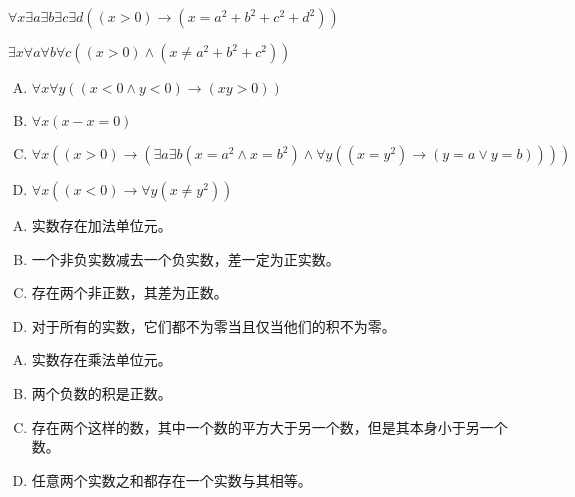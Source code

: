 {{        %
        \begin{practices}
             $\forall x \exists a \exists b \exists c \exists d ((x > 0) \rightarrow (x = a^2 + b^2 + c^2 + d^2))$
        \end{practices}

        \begin{practices}
             $\exists x \forall a \forall b \forall c ((x > 0) \wedge (x \neq a^2 + b^2 + c^2))$
        \end{practices}


        \begin{practices}
            \begin{enumerate}[A.]
                \item $\forall x \forall y ((x < 0 \wedge y < 0) \rightarrow (xy > 0))$
                \item $\forall x (x - x = 0)$
                \item $\forall x ((x > 0) \rightarrow (\exists a \exists b (x = a^2 \wedge x = b^2) \wedge \forall y ((x = y^2) \rightarrow (y = a \vee y = b))))$
                \item $\forall x ((x < 0) \rightarrow \forall y (x \neq y^2))$
            \end{enumerate}
        \end{practices}

        \begin{practices}
            \begin{enumerate}[A.]
                \item 实数存在加法单位元。
                \item 一个非负实数减去一个负实数，差一定为正实数。
                \item 存在两个非正数，其差为正数。
                \item 对于所有的实数，它们都不为零当且仅当他们的积不为零。
            \end{enumerate}
        \end{practices}

        \begin{practices}
            \begin{enumerate}[A.]
                \item 实数存在乘法单位元。
                \item 两个负数的积是正数。
                \item 存在两个这样的数，其中一个数的平方大于另一个数，但是其本身小于另一个数。
                \item 任意两个实数之和都存在一个实数与其相等。
            \end{enumerate}
        \end{practices}

}}
